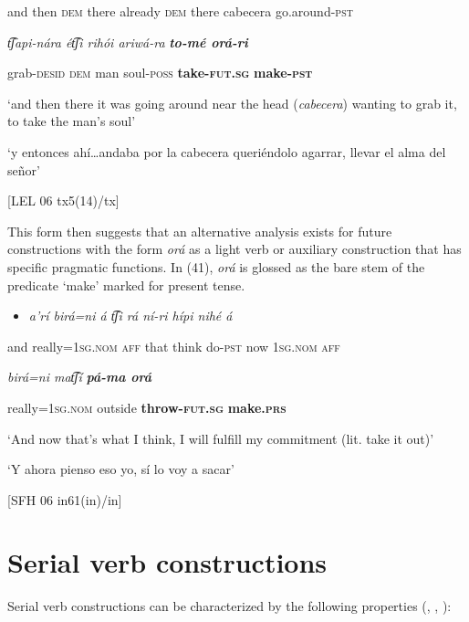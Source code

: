 and   then   \textsc{dem} there   already   \textsc{dem} there   cabecera    go.around-\textsc{pst}

 \textit{t͡ʃapi-nára   ét͡ʃi  rihói   ariwá-ra} \textbf{\textit{to-mé     orá-ri}}

  grab-\textsc{desid}  \textsc{dem} man   soul-\textsc{poss} \textbf{take-\textsc{fut.sg} }\textbf{make-\textsc{pst}}

‘and then there it was going around near the head (\textit{cabecera}) wanting to grab it, to take the man’s soul’

  ‘y entonces ahí…andaba por la cabecera queriéndolo agarrar, llevar el alma del señor’

  [LEL 06 tx5(14)/tx]

  This form then suggests that an alternative analysis exists for future constructions with the form \textit{orá} as a light verb or auxiliary construction that has specific pragmatic functions. In (41), \textit{orá} is glossed as the bare stem of the predicate ‘make’ marked for present tense.

\begin{itemize}
\item \textit{a’rí   birá=ni     á   t͡ʃi  rá   ní-ri   hípi   nihé    á}     
\end{itemize}

and  really=1\textsc{sg.nom  aff} that  think  do-\textsc{pst} now  1\textsc{sg.nom  aff} 

\textit{birá=ni     mat͡ʃí} \textbf{\textit{pá-ma     orá}} 

really=1\textsc{sg.nom} outside    \textbf{throw-\textsc{fut.sg} }\textbf{make.\textsc{prs}}

‘And now that’s what I think, I will fulfill my commitment (lit. take it out)’

‘Y ahora pienso eso yo, sí lo voy a sacar’

[SFH 06 in61(in)/in]

\section{Serial verb constructions}
\label{sec: serial verb constructions}

Serial verb constructions can be characterized by the following properties (\citealt{foley1985clausehood}, \citealt{sebba1987syntax}, \citealt{aikhenvald2006serial}):

